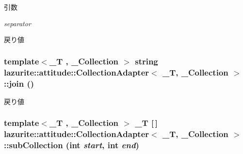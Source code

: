 \begin{DoxyParams}{引数}
\item[{\em separator}]\end{DoxyParams}
\begin{DoxyReturn}{戻り値}

\end{DoxyReturn}
\hypertarget{classlazurite_1_1attitude_1_1_collection_adapter_3_01___t_00_01___collection_01_4_ae160d2f2c6c54de7694a0b38eed61809}{
\subsubsection[{join}]{\setlength{\rightskip}{0pt plus 5cm}template$<$\_\-T , \_\-Collection $>$ string lazurite::attitude::CollectionAdapter$<$ \_\-T, \_\-Collection $>$::join ()}}
\label{classlazurite_1_1attitude_1_1_collection_adapter_3_01___t_00_01___collection_01_4_ae160d2f2c6c54de7694a0b38eed61809}
\begin{DoxyReturn}{戻り値}

\end{DoxyReturn}
\hypertarget{classlazurite_1_1attitude_1_1_collection_adapter_3_01___t_00_01___collection_01_4_aa519a6f4c9cfedeacfadca30c3fce4f9}{
\subsubsection[{subCollection}]{\setlength{\rightskip}{0pt plus 5cm}template$<$\_\-T , \_\-Collection $>$ \_\-T \mbox{[}$\,$\mbox{]} lazurite::attitude::CollectionAdapter$<$ \_\-T, \_\-Collection $>$::subCollection (int {\em start}, \/  int {\em end})}}
\label{classlazurite_1_1attitude_1_1_collection_adapter_3_01___t_00_01___collection_01_4_aa519a6f4c9cfedeacfadca30c3fce4f9}

